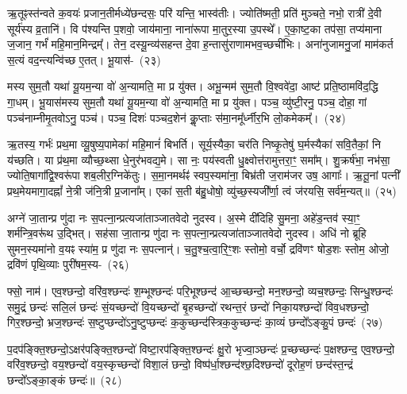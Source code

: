 ऋ॒तूꣴस्त॑न्वते क॒वयः॑ प्रजान॒तीर्मध्ये॑छन्दसः॒ परि॑ यन्ति॒ भास्व॑तीः। ज्योति॑ष्मती॒ प्रति॑ मुञ्चते॒ नभो॒ रात्री॑ दे॒वी सूर्य॑स्य व्र॒तानि॑। वि प॑श्यन्ति प॒शवो॒ जाय॑माना॒ नाना॑रूपा मा॒तुर॒स्या उ॒पस्थे᳚। ए॒का॒ष्ट॒का तप॑सा॒ तप्य॑माना ज॒जान॒ गर्भं॑ महि॒मान॒मिन्द्रम्᳚। तेन॒ दस्यू॒न्व्य॑सहन्त दे॒वा ह॒न्तासु॑राणामभव॒च्छची॑भिः। अना॑नुजामनु॒जां माम॑कर्त स॒त्यं वद॒न्त्यन्वि॑च्छ ए॒तत्। भू॒यास॑-~(२३)\ip

मस्य सुम॒तौ यथा॑ यू॒यम॒न्या वो॑ अ॒न्यामति॒ मा प्र यु॑क्त। अभू॒न्मम॑ सुम॒तौ वि॒श्ववे॑दा॒ आष्ट॑ प्रति॒ष्ठामवि॑द॒द्धि गा॒धम्। भू॒यास॑मस्य सुम॒तौ यथा॑ यू॒यम॒न्या वो॑ अ॒न्यामति॒ मा प्र यु॑क्त। पञ्च॒ व्यु॑ष्टी॒रनु॒ पञ्च॒ दोहा॒ गां पञ्च॑नाम्नीमृ॒तवो\-ऽनु॒ पञ्च॑। पञ्च॒ दिशः॑ पञ्च\-द॒शेन॑ कॢ॒प्ताः स॑मा॒नमू᳚र्ध्नीर॒भि लो॒कमेकम्᳚।~(२४)\ip

ऋ॒तस्य॒ गर्भः॑ प्रथ॒मा व्यू॒षुष्य॒पामेका॑ महि॒मानं॑ बिभर्ति। सूर्य॒स्यैका॒ चर॑ति निष्कृ॒तेषु॑ घ॒र्मस्यैका॑ सवि॒तैकां॒ नि य॑च्छति। या प्र॑थ॒मा व्यौच्छ॒थ्सा धे॒नुर॑भवद्य॒मे। सा नः॒ पय॑स्वती धु॒क्ष्वोत्त॑रामुत्तरा॒ꣳ॒ समा᳚म्। शु॒क्रर्\mbox{}ष॑भा॒ नभ॑सा॒ ज्योति॒षागा᳚द्वि॒श्वरू॑पा शब॒लीर॒ग्निके॑तुः। स॒मा॒नमर्थꣴ॑ स्वप॒स्यमा॑ना॒ बिभ्र॑ती ज॒राम॑जर उष॒ आगाः᳚। ऋ॒तू॒नां पत्नी᳚ प्रथ॒मेयमागा॒दह्नां᳚ ने॒त्री ज॑नि॒त्री प्र॒जाना᳚म्। एका॑ स॒ती ब॑हु॒धोषो॒ व्यु॑च्छ॒स्यजी᳚र्णा॒ त्वं ज॑रयसि॒ सर्व॑म॒न्यत्॥~(२५)\ip

{\anuvakamend[{ऊर्ज॒मेका᳚ प्रतिमु॒ञ्चमा॑ना भू॒यास॒मेकं॒ पत्न्येका॒न्नविꣳ॑श॒तिश्च॑}]}%

अग्ने॑ जा॒तान्प्र णु॑दा नः स॒पत्ना॒न्प्रत्यजा॑ताञ्जातवेदो नुदस्व। अ॒स्मे दी॑दिहि सु॒मना॒ अहे॑ड॒न्तव॑ स्या॒ꣳ॒ शर्म॑न्त्रि॒वरू॑थ उ॒द्भित्। सह॑सा जा॒तान्प्र णु॑दा नः स॒पत्ना॒न्प्रत्यजा॑ताञ्जातवेदो नुदस्व। अधि॑ नो ब्रूहि सुमन॒स्यमा॑नो व॒यꣴ स्या॑म॒ प्र णु॑दा नः स॒पत्नान्॑। च॒तु॒श्च॒त्वा॒रि॒ꣳ॒शः स्तोमो॒ वर्चो॒ द्रवि॑णꣳ षोड॒शः स्तोम॒ ओजो॒ द्रवि॑णं पृथि॒व्याः पुरी॑षम॒स्य-~(२६)\ip

फ्सो॒ नाम॑। एव॒श्छन्दो॒ वरि॑व॒श्छन्दः॑ श॒म्भूश्छन्दः॑ परि॒भूश्छन्द॑ आ॒च्छच्छन्दो॒ मन॒श्छन्दो॒ व्यच॒श्छन्दः॒ सिन्धु॒श्छन्दः॑ समु॒द्रं छन्दः॑ सलि॒लं छन्दः॑ सं॒यच्छन्दो॑ वि॒यच्छन्दो॑ बृ॒हच्छन्दो॑ रथन्त॒रं छन्दो॑ निका॒यश्छन्दो॑ विव॒धश्छन्दो॒ गिर॒श्छन्दो॒ भ्रज॒श्छन्दः॑ स॒ष्टुप्छन्दो॑\-ऽनु॒ष्टुप्छन्दः॑ क॒कुच्छन्द॑स्त्रिक॒कुच्छन्दः॑ का॒व्यं छन्दो᳚\-ऽङ्कु॒पं छन्दः॑~(२७)\ip

प॒दप॑ङ्क्ति॒श्छन्दो॒\-ऽक्षर॑पङ्क्ति॒श्छन्दो॑ विष्टा॒रप॑ङ्क्ति॒श्छन्दः॑ क्षु॒रो भृज्वा॒ञ्छन्दः॑ प्र॒च्छच्छन्दः॑ प॒क्षश्छन्द॒ एव॒श्छन्दो॒ वरि॑व॒श्छन्दो॒ वय॒श्छन्दो॑ वय॒स्कृच्छन्दो॑ विशा॒लं छन्दो॒ विष्प॑र्धा॒श्छन्द॑श्छ॒दिश्छन्दो॑ दूरोह॒णं छन्द॑स्त॒न्द्रं छन्दो᳚\-ऽङ्का॒ङ्कं छन्दः॑॥~(२८)\ip

